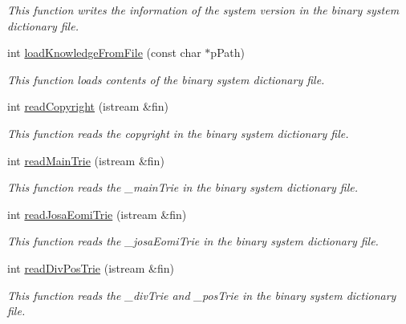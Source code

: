 \begin{CompactItemize}
\begin{CompactList}\small\item\em This function writes the information of the system version in the binary system dictionary file. \item\end{CompactList}\item 
int \hyperlink{classkmaOrange_1_1Dictionary_55b07fdaf668789b26249850126391d7}{loadKnowledgeFromFile} (const char $\ast$pPath)
\begin{CompactList}\small\item\em This function loads contents of the binary system dictionary file. \item\end{CompactList}\item 
int \hyperlink{classkmaOrange_1_1Dictionary_24fb974af5fd5c4f9b471b2b633d78c8}{readCopyright} (istream \&fin)
\begin{CompactList}\small\item\em This function reads the copyright in the binary system dictionary file. \item\end{CompactList}\item 
int \hyperlink{classkmaOrange_1_1Dictionary_72117f9ee66237abee6a4e1cbe607a51}{readMainTrie} (istream \&fin)
\begin{CompactList}\small\item\em This function reads the \_\-mainTrie in the binary system dictionary file. \item\end{CompactList}\item 
int \hyperlink{classkmaOrange_1_1Dictionary_2c33512975c472072bbf92eaac0d76f7}{readJosaEomiTrie} (istream \&fin)
\begin{CompactList}\small\item\em This function reads the \_\-josaEomiTrie in the binary system dictionary file. \item\end{CompactList}\item 
int \hyperlink{classkmaOrange_1_1Dictionary_61dd5200de96564edbc8c3506cec743e}{readDivPosTrie} (istream \&fin)
\begin{CompactList}\small\item\em This function reads the \_\-divTrie and \_\-posTrie in the binary system dictionary file. \item\end{CompactList}\item 

\end{CompactItemize}
